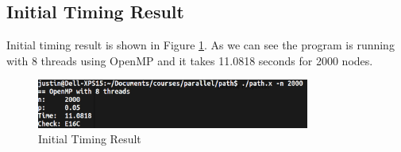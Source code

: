 \subsection{Initial Timing Result}

Initial timing result is shown in Figure \ref{initial_profile_result_2}. As we
can see the program is running with 8 threads using OpenMP and it takes 11.0818
seconds for 2000 nodes.

\begin{figure}[h]
    \centering
    \includegraphics[width=0.8\textwidth]{figs/0_timing.png}
    \caption{Initial Timing Result}
    \label{initial_profile_result_2}
\end{figure}

